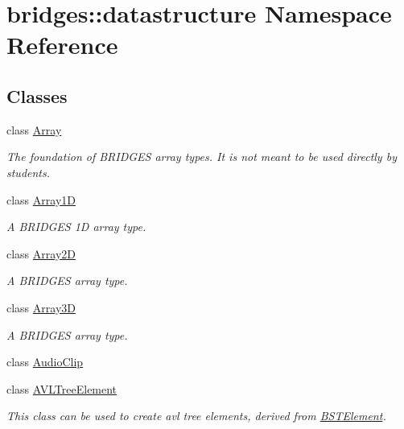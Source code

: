 \hypertarget{namespacebridges_1_1datastructure}{}\section{bridges\+:\+:datastructure Namespace Reference}
\label{namespacebridges_1_1datastructure}
\subsection*{Classes}
\begin{DoxyCompactItemize}
\item 
class \hyperlink{classbridges_1_1datastructure_1_1_array}{Array}
\begin{DoxyCompactList}\small\item\em The foundation of B\+R\+I\+D\+G\+ES array types. It is not meant to be used directly by students. \end{DoxyCompactList}\item 
class \hyperlink{classbridges_1_1datastructure_1_1_array1_d}{Array1D}
\begin{DoxyCompactList}\small\item\em A B\+R\+I\+D\+G\+ES 1D array type. \end{DoxyCompactList}\item 
class \hyperlink{classbridges_1_1datastructure_1_1_array2_d}{Array2D}
\begin{DoxyCompactList}\small\item\em A B\+R\+I\+D\+G\+ES array type. \end{DoxyCompactList}\item 
class \hyperlink{classbridges_1_1datastructure_1_1_array3_d}{Array3D}
\begin{DoxyCompactList}\small\item\em A B\+R\+I\+D\+G\+ES array type. \end{DoxyCompactList}\item 
class \hyperlink{classbridges_1_1datastructure_1_1_audio_clip}{Audio\+Clip}
\item 
class \hyperlink{classbridges_1_1datastructure_1_1_a_v_l_tree_element}{A\+V\+L\+Tree\+Element}
\begin{DoxyCompactList}\small\item\em This class can be used to create avl tree elements, derived from \hyperlink{classbridges_1_1datastructure_1_1_b_s_t_element}{B\+S\+T\+Element}. \end{DoxyCompactList}\item 

\end{DoxyCompactItemize}
